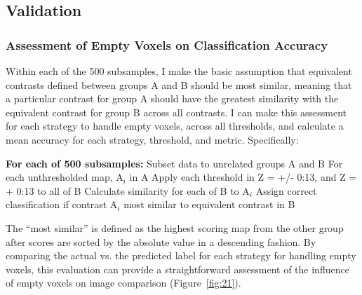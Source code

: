 \documentclass{report}
\begin{document}
\subsection{Validation}

\subsubsection{Assessment of Empty Voxels on Classification Accuracy}

Within each of the 500 subsamples, I make the basic assumption that
equivalent contrasts defined between groups A and B should be most
similar, meaning that a particular contrast for group A should have the
greatest similarity with the equivalent contrast for group B across all
contrasts. I can make this assessment for each strategy to handle empty
voxels, across all thresholds, and calculate a mean accuracy for each
strategy, threshold, and metric. Specifically: \newline \newline

\textbf{For each of 500 subsamples:} \newline
\indent \indent Subset data to unrelated groups A and B \newline
\indent \indent For each unthresholded map, A$_{i}$ in A \newline
\indent \indent \indent Apply each threshold in Z = +/- 0:13, and Z = + 0:13 to all of B \newline
\indent \indent \indent Calculate similarity for each of B to A$_{i}$   \newline  
\indent \indent \indent Assign correct classification if contrast A$_{i}$ most similar to equivalent contrast in B \newline \newline


The ``most similar'' is defined as the highest scoring map from the
other group after scores are sorted by the absolute value in a
descending fashion. By comparing the actual vs. the predicted label for
each strategy for handling empty voxels, this evaluation can provide a
straightforward assessment of the influence of empty voxels on image
comparison (Figure~\ref{fig:21}).
\end{document}
